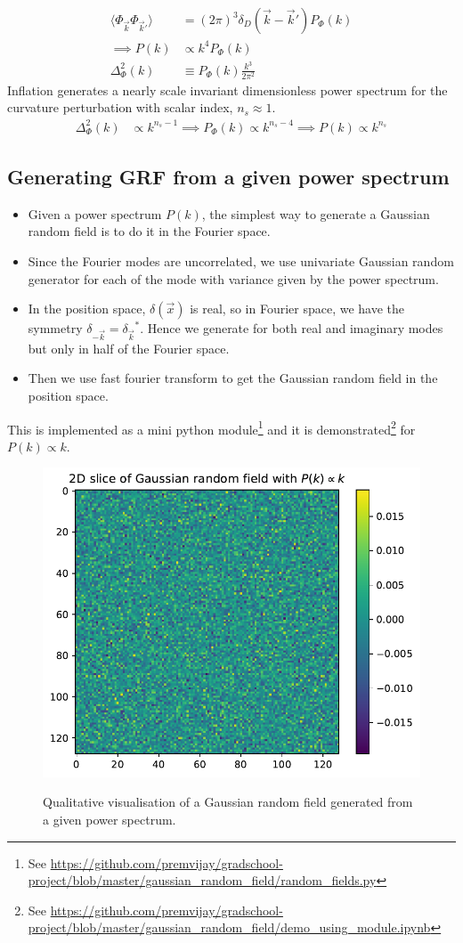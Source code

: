 \documentclass[12pt]{article}
\begin{document}
\begin{align}
\langle \Phi_{\vec{k}} \Phi_{\vec{k}'} \rangle &= (2 \pi)^3 \delta_{D} (\vec{k} - \vec{k}') P_{\Phi}(k)\\
\implies P(k) &\propto k^4 P_{\Phi}(k)\\
\Delta_{\Phi}^2(k) &\equiv P_{\Phi}(k) \frac{k^3}{2 \pi^2}
\end{align}
Inflation generates a nearly scale invariant dimensionless power spectrum for the curvature perturbation with scalar index, $n_s \approx 1$.
\begin{align}
\Delta_{\Phi}^2(k) &\propto k^{n_s-1} \implies P_{\Phi}(k) \propto k^{n_s-4} \implies P(k) \propto k^{n_s}
\end{align}


\subsection{Generating GRF from a given power spectrum}
\label{sec:grf-generate}
\begin{itemize}
\item Given a power spectrum $P(k)$, the simplest way to generate a Gaussian random field is to do it in the Fourier space.
\item Since the Fourier modes are uncorrelated, we use univariate Gaussian random generator for each of the mode with variance given by the power spectrum.
\item In the position space, $\delta (\vec{x})$ is real, so in Fourier space, we have the symmetry $\delta_{-\vec{k}}= {\delta_{\vec{k}}}^{*}$. Hence we generate for both real and imaginary modes but only in half of the Fourier space.
\item Then we use fast fourier transform to get the Gaussian random field in the position space.
\end{itemize}
This is implemented as a mini python module\footnote{See \url{https://github.com/premvijay/gradschool-project/blob/master/gaussian_random_field/random_fields.py}} and it is demonstrated\footnote{See \url{https://github.com/premvijay/gradschool-project/blob/master/gaussian_random_field/demo_using_module.ipynb}} for $P(k) \propto k$.
\begin{figure}[H]
	\centering
	\caption{Qualitative visualisation of a Gaussian random field generated from a given power spectrum.}
	\includegraphics[width=0.7\linewidth]{../gaussian_random_field/GRF-scale-invariant-spectrum}
	\label{fig:grf-scale-invariant-spectrum}
\end{figure}
\end{document}
